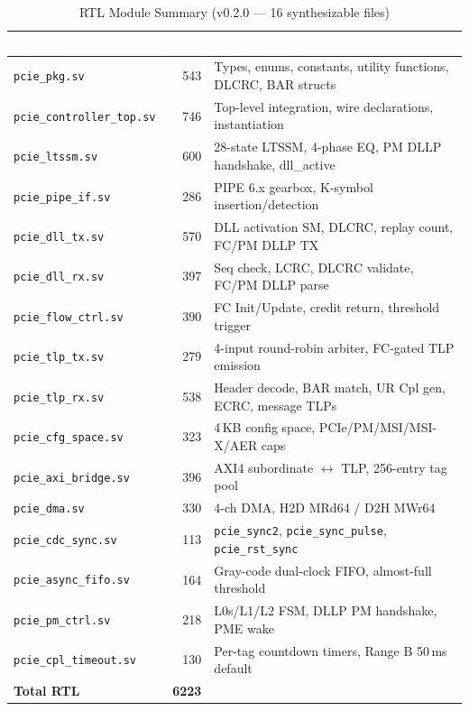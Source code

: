 \documentclass[12pt,a4paper]{report}
\newcommand{\theadcell}[1]{%
  \cellcolor{tablehead}\textcolor{white}{\textbf{#1}}}
\begin{document}
\begin{table}[H]
\centering
\caption{RTL Module Summary (v0.2.0 — 16 synthesizable files)}
\label{tab:modules}
\begin{tabular}{p{4.5cm}r p{7cm}}
  \toprule
  \theadcell{Module} & \theadcell{Lines} & \theadcell{Responsibility} \\
  \midrule
  \texttt{pcie\_pkg.sv}            & 543 & Types, enums, constants, utility functions, DLCRC, BAR structs \\
  \texttt{pcie\_controller\_top.sv}& 746 & Top-level integration, wire declarations, instantiation \\
  \texttt{pcie\_ltssm.sv}          & 600 & 28-state LTSSM, 4-phase EQ, PM DLLP handshake, dll\_active \\
  \texttt{pcie\_pipe\_if.sv}       & 286 & PIPE 6.x gearbox, K-symbol insertion/detection \\
  \texttt{pcie\_dll\_tx.sv}        & 570 & DLL activation SM, DLCRC, replay count, FC/PM DLLP TX \\
  \texttt{pcie\_dll\_rx.sv}        & 397 & Seq check, LCRC, DLCRC validate, FC/PM DLLP parse \\
  \texttt{pcie\_flow\_ctrl.sv}     & 390 & FC Init/Update, credit return, threshold trigger \\
  \texttt{pcie\_tlp\_tx.sv}        & 279 & 4-input round-robin arbiter, FC-gated TLP emission \\
  \texttt{pcie\_tlp\_rx.sv}        & 538 & Header decode, BAR match, UR Cpl gen, ECRC, message TLPs \\
  \texttt{pcie\_cfg\_space.sv}     & 323 & 4\,KB config space, PCIe/PM/MSI/MSI-X/AER caps \\
  \texttt{pcie\_axi\_bridge.sv}    & 396 & AXI4 subordinate $\leftrightarrow$ TLP, 256-entry tag pool \\
  \texttt{pcie\_dma.sv}            & 330 & 4-ch DMA, H2D MRd64 / D2H MWr64 \\
  \texttt{pcie\_cdc\_sync.sv}      & 113 & \texttt{pcie\_sync2}, \texttt{pcie\_sync\_pulse}, \texttt{pcie\_rst\_sync} \\
  \texttt{pcie\_async\_fifo.sv}    & 164 & Gray-code dual-clock FIFO, almost-full threshold \\
  \texttt{pcie\_pm\_ctrl.sv}       & 218 & L0s/L1/L2 FSM, DLLP PM handshake, PME wake \\
  \texttt{pcie\_cpl\_timeout.sv}   & 130 & Per-tag countdown timers, Range B 50\,ms default \\
  \midrule
  \textbf{Total RTL}               & \textbf{6223} & \\
  \bottomrule
\end{tabular}
\end{table}
\end{document}
